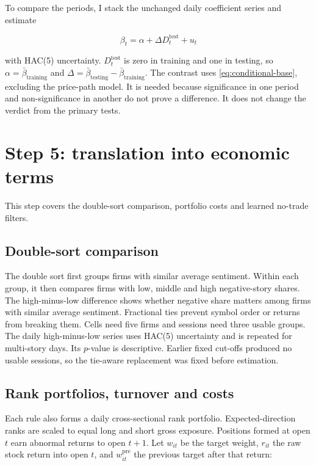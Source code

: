 To compare the periods, I stack the unchanged daily coefficient series and estimate

\begin{equation}
 \beta_t=\alpha+\Delta D^{\mathrm{test}}_t+u_t
 \label{eq:temporal-contrast}
\end{equation}

\noindent with HAC(5) uncertainty. $D^{\mathrm{test}}_t$ is zero in
training and one in testing, so $\alpha=\bar\beta_{\mathrm{training}}$ and
$\Delta=\bar\beta_{\mathrm{testing}}-\bar\beta_{\mathrm{training}}$. The contrast
uses \cref{eq:conditional-base}, excluding the price-path model. It is needed
because significance in one period and non-significance in another do not prove
a difference. It does not change the verdict from the primary tests.

\section{Step 5: translation into economic terms}

This step covers the double-sort comparison, portfolio costs and learned
no-trade filters.

\subsection{Double-sort comparison}

The double sort first groups firms with similar average sentiment. Within each
group, it then compares firms with low, middle and high negative-story shares.
The high-minus-low difference shows whether negative share matters among firms
with similar average sentiment. Fractional ties prevent symbol order or returns
from breaking them. Cells need five firms and sessions need three usable groups.
The daily high-minus-low series uses HAC(5) uncertainty and is repeated for
multi-story days. Its $p$-value is descriptive. Earlier fixed cut-offs produced
no usable sessions, so the tie-aware replacement was fixed before estimation.

\subsection{Rank portfolios, turnover and costs}

Each rule also forms a daily cross-sectional rank portfolio. Expected-direction
ranks are scaled to equal long and short gross exposure. Positions formed at
open $t$ earn abnormal returns to open $t+1$. Let $w_{it}$ be the target weight,
$r_{it}$ the raw stock return into open $t$, and $w^{\mathrm{pre}}_{it}$ the
previous target after that return:

